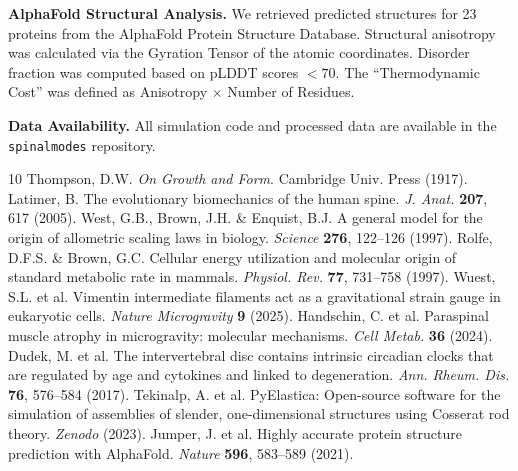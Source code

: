 \documentclass[11pt]{article}
\begin{document}
\textbf{AlphaFold Structural Analysis.} We retrieved predicted structures for 23 proteins from the AlphaFold Protein Structure Database\cite{jumper2021}. Structural anisotropy was calculated via the Gyration Tensor of the atomic coordinates. Disorder fraction was computed based on pLDDT scores $< 70$. The ``Thermodynamic Cost'' was defined as Anisotropy $\times$ Number of Residues.

\textbf{Data Availability.} All simulation code and processed data are available in the \texttt{spinalmodes} repository.

\begin{thebibliography}{10}
 Thompson, D.W. \textit{On Growth and Form}. Cambridge Univ. Press (1917).
 Latimer, B. The evolutionary biomechanics of the human spine. \textit{J. Anat.} \textbf{207}, 617 (2005).
 West, G.B., Brown, J.H. \& Enquist, B.J. A general model for the origin of allometric scaling laws in biology. \textit{Science} \textbf{276}, 122–126 (1997).
 Rolfe, D.F.S. \& Brown, G.C. Cellular energy utilization and molecular origin of standard metabolic rate in mammals. \textit{Physiol. Rev.} \textbf{77}, 731–758 (1997).
 Wuest, S.L. et al. Vimentin intermediate filaments act as a gravitational strain gauge in eukaryotic cells. \textit{Nature Microgravity} \textbf{9} (2025).
 Handschin, C. et al. Paraspinal muscle atrophy in microgravity: molecular mechanisms. \textit{Cell Metab.} \textbf{36} (2024).
 Dudek, M. et al. The intervertebral disc contains intrinsic circadian clocks that are regulated by age and cytokines and linked to degeneration. \textit{Ann. Rheum. Dis.} \textbf{76}, 576–584 (2017).
 Tekinalp, A. et al. PyElastica: Open-source software for the simulation of assemblies of slender, one-dimensional structures using Cosserat rod theory. \textit{Zenodo} (2023).
 Jumper, J. et al. Highly accurate protein structure prediction with AlphaFold. \textit{Nature} \textbf{596}, 583–589 (2021).
\end{thebibliography}
\end{document}
